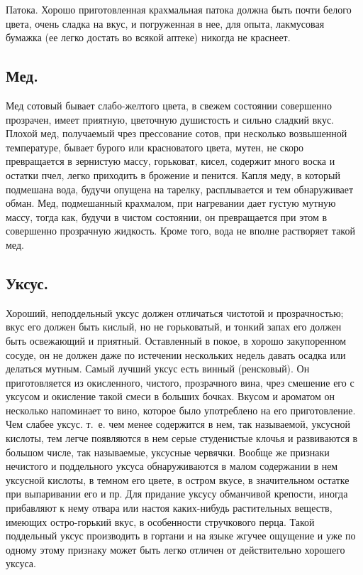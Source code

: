 Патока. Хорошо приготовленная крахмальная патока должна быть почти белого цвета, очень сладка на вкус, и погруженная в нее, для опыта, лакмусовая бумажка (ее легко достать во всякой аптеке) никогда не краснеет.

\subsection{Мед.}
Мед сотовый бывает слабо-желтого цвета, в свежем состоянии совершенно прозрачен, имеет приятную, цветочную душистость и сильно сладкий вкус. Плохой мед, получаемый чрез прессование сотов, при несколько возвышенной температуре, бывает бурого или красноватого цвета, мутен, не скоро превращается в зернистую массу, горьковат, кисел, содержит много воска и остатки пчел, легко приходить в брожение и пенится. Капля меду, в который подмешана вода, будучи опущена на тарелку, расплывается и тем обнаруживает обман. Мед, подмешанный крахмалом, при нагревании дает густую мутную массу, тогда как, будучи в чистом состоянии, он превращается при этом в совершенно прозрачную жидкость. Кроме того, вода не вполне растворяет такой мед.

\subsection{Уксус.}
Хороший, неподдельный уксус должен отличаться чистотой и прозрачностью; вкус его должен быть кислый, но не горьковатый, и тонкий запах его должен быть освежающий и приятный. Оставленный в покое, в хорошо закупоренном сосуде, он не должен даже по истечении нескольких недель давать осадка или делаться мутным. Самый лучший уксус есть винный (ренсковый). Он приготовляется из окисленного, чистого, прозрачного вина, чрез смешение его с уксусом и окисление такой смеси в больших бочках. Вкусом и ароматом он несколько напоминает то вино, которое было употреблено на его приготовление. Чем слабее уксус. т.~е. чем менее содержится в нем, так называемой, уксусной кислоты, тем легче появляются в нем серые студенистые клочья и развиваются в большом числе, так называемые, уксусные червячки. Вообще же признаки нечистого и поддельного уксуса обнаруживаются в малом содержании в нем уксусной кислоты, в темном его цвете, в остром вкусе, в значительном остатке при выпаривании его и пр. Для придание уксусу обманчивой крепости, иногда прибавляют к нему отвара или настоя каких-нибудь растительных веществ, имеющих остро-горький вкус, в особенности стручкового перца. Такой поддельный уксус производить в гортани и на языке жгучее ощущение и уже по одному этому признаку может быть легко отличен от действительно хорошего уксуса.

